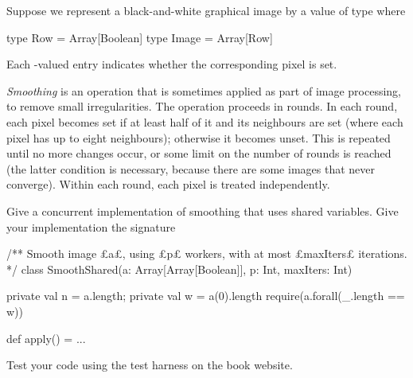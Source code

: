\begin{question}
Suppose we represent a black-and-white graphical image by a value of type
 where
\begin{scala}
  type Row = Array[Boolean]
  type Image = Array[Row]
\end{scala}
Each -valued entry indicates whether the corresponding pixel is
set.

\emph{Smoothing} is an operation that is sometimes applied as part of image
processing, to remove small irregularities.  The operation proceeds in rounds.
In each round, each pixel becomes set if at least half of it and its
neighbours are set (where each pixel has up to eight neighbours); otherwise it
becomes unset.  This is repeated until no more changes occur, or some limit on
the number of rounds is reached (the latter condition is necessary, because
there are some images that never converge).  Within each round, each pixel is
treated independently.

Give a concurrent implementation of smoothing that uses shared variables.
Give your implementation the signature
\begin{scala}
/** Smooth image £a£, using £p£ workers, with at most £maxIters£ iterations. */
class SmoothShared(a: Array[Array[Boolean]], p: Int, maxIters: Int){
  private val n = a.length; private val w = a(0).length
  require(a.forall(_.length == w))

  def apply() = ...
}
\end{scala}
%
Test your code using the test harness on the book website.
\end{question}


